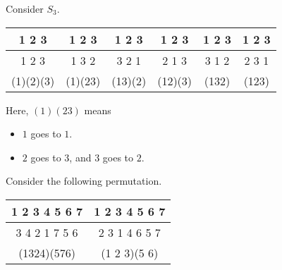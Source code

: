 \begin{example}
    Consider $S_3$. 

    \begin{table}[ht!]
        \centering
        \begin{tabular}{c c c c c c}
            1 2 3 & 1 2 3 & 1 2 3 & 1 2 3 & 1 2 3 & 1 2 3 \\
            \hline 
            1 2 3 & 1 3 2 & 3 2 1 & 2 1 3 & 3 1 2 & 2 3 1 \\
            (1)(2)(3) & (1)(23) & (13)(2) & (12)(3) & (132) & (123) \\
        \end{tabular}
    \end{table}

    Here, $(1)(23)$ means

    \begin{itemize}
        \item $1$ goes to $1$.
        \item $2$ goes to $3$, and $3$ goes to $2$.
    \end{itemize}
\end{example}

\begin{example}
    Consider the following permutation. 

    \begin{table}[ht!]
        \centering
        \begin{tabular}{c|c}
            1 2 3 4 5 6 7 & 1 2 3 4 5 6 7 \\
            \hline
            3 4 2 1 7 5 6 & \color{blue}2 3 1 4 6 5 7 \\
            \color{blue}(1324)(576) & (1 2 3)(5 6)
        \end{tabular}
    \end{table}
\end{example}

